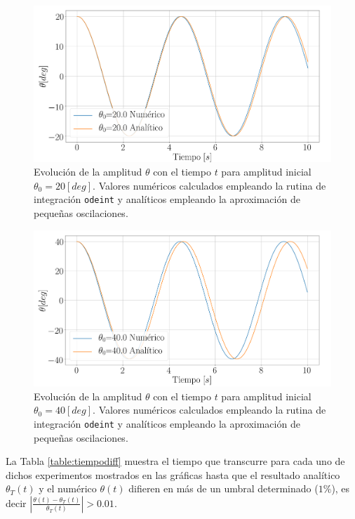 \documentclass[journal]{IEEEtran}
\begin{document}
\begin{figure}[!htb]
  \centering
  \includegraphics[width=\linewidth]{theta_20_diff}
  \caption{Evolución de la amplitud $\theta$ con el tiempo $t$ para amplitud inicial $\theta_0 = 20 [deg]$. Valores numéricos calculados empleando la rutina de integración \texttt{odeint} y analíticos empleando la aproximación de pequeñas oscilaciones.}
  \label{fig:numanal_20}
\end{figure}
\begin{figure}[!htb]
  \centering
  \includegraphics[width=\linewidth]{theta_40_diff}
  \caption{Evolución de la amplitud $\theta$ con el tiempo $t$ para amplitud inicial $\theta_0 = 40 [deg]$. Valores numéricos calculados empleando la rutina de integración \texttt{odeint} y analíticos empleando la aproximación de pequeñas oscilaciones.}
  \label{fig:numanal_40}
\end{figure}

La Tabla \ref{table:tiempodiff} muestra el tiempo que transcurre para cada uno de dichos experimentos mostrados en las gráficas hasta que el resultado analítico $\theta_T(t)$ y el numérico $\theta(t)$ difieren en más de un umbral determinado ($1\%$), es decir $\left|\displaystyle\frac{\theta(t) - \theta_T(t)}{\theta_T(t)}\right|>0.01$.
\end{document}
